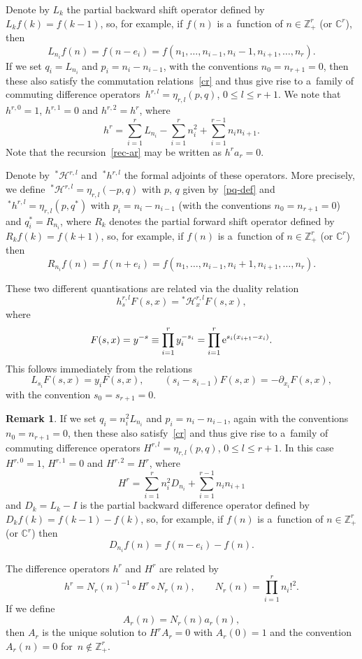 \documentclass[pdftex]{sigma}
\theoremstyle{definition}
\newtheorem{rem}[thm]{Remark}
\newcommand{\C}{{\mathbb C}}
\newcommand\Z{{\mathbb Z}}
\renewcommand\H{{\mathcal H}}
\begin{document}
Denote by $L_k$ the partial backward shift operator defined by $L_k f(k) = f(k-1)$,
so, for example, if $f(n)$ is a~function of $n\in\Z_+^r$ (or $\C^r$), then
\[L_{n_i}f(n)=f(n-e_i)=f(n_1,\dots,n_{i-1},n_i-1,n_{i+1},\dots,n_r).\]
If we set $q_i=L_{n_i}$ and $p_i=n_i-n_{i-1}$, with the conventions
$n_0=n_{r+1}=0$, then these also satisfy the commutation relations~\eqref{cr}
and thus give rise to a~family of commuting difference operators~${h^{r,l}=\eta_{r,l}(p,q)}$, $0\le l\le r+1$.
We note that $h^{r,0}=1$, $h^{r,1}=0$ and $h^{r,2}=h^r$, where
\[h^r =\sum_{i=1}^r L_{n_i} - \sum_{i=1}^r n_i^2 + \sum_{i=1}^{r-1} n_i n_{i+1}. \]
Note that the recursion~\eqref{rec-ar} may be written as $h^r a_r=0$.

Denote by $~^*\! \H^{r,l}$ and $~^*\! h^{r,l}$
the formal adjoints of these operators. More precisely, we define
$~^*\! \H^{r,l}=\eta_{r,l}(-p,q)$ with $p$, $q$ given by~\eqref{pq-def} and
$~^*\! h^{r,l} = \eta_{r,l}(p,q^*)$ with $p_i=n_i-n_{i-1}$
(with the conventions $n_0=n_{r+1}=0$) and $q_i^*=R_{n_i}$,
where $R_k$ denotes the partial forward shift operator defined by $R_k f(k) = f(k+1)$,
so, for example, if $f(n)$ is a~function of $n\in\Z_+^r$ (or $\C^r$) then
\[R_{n_i}f(n)=f(n+e_i)=f(n_1,\dots,n_{i-1},n_i+1,n_{i+1},\dots,n_r).\]

These two different quantisations are related via the duality relation
\begin{equation}\label{hH-rel}
h_s^{r,l} F(s,x) = {}^*\! \H_x^{r,l} F(s,x),
\end{equation}
where
\[F(s,x)=y^{-s}\equiv \prod_{i=1}^r y_i^{-s_i}=\prod_{i=1}^r {\rm e}^{s_i(x_{i+1}-x_{i})}.\]
This follows immediately from the relations
\[L_{s_i} F(s,x) = y_i F(s,x),\qquad (s_i-s_{i-1}) F(s,x) = - \partial_{x_i} F(s,x),\]
with the convention $s_0=s_{r+1}=0$.

\begin{rem}\label{rem-H}
If we set $q_i=n_i^2 L_{n_i}$ and $p_i=n_i-n_{i-1}$, again with the conventions
$n_0=n_{r+1}=0$, then these also satisfy~\eqref{cr}
and thus give rise to a~family of commuting difference operators
$H^{r,l}=\eta_{r,l}(p,q)$, $0\le l\le r+1$. In this case $H^{r,0}=1$, $H^{r,1}=0$ and
$H^{r,2}=H^r$, where
\[H^r = \sum_{i=1}^r n_i^2 D_{n_i} +\sum_{i=1}^{r-1} n_i n_{i+1}\]
and $D_k = L_k-I$ is the partial backward difference operator defined by $D_k f(k) = f(k-1) - f(k)$,
so, for example, if $f(n)$ is a~function of $n\in\Z_+^r$ (or $\C^r$) then
\[D_{n_i}f(n)=f(n-e_i)-f(n).\]

The difference operators $h^r$ and $H^r$ are related by
\[h^r=N_r(n)^{-1}\circ H^r \circ N_r(n),\qquad N_r(n)=\prod_{i=1}^r n_i!^2.\]
If we define
\begin{equation}\label{Ar-def}
A_r(n)=N_r(n) a_r(n),
\end{equation} then $A_r$ is the unique solution to $H^rA_r=0$
with $A_r(0)=1$ and the convention $A_r(n)=0$ for~${n\notin\Z_+^r}$.
\end{rem}
\end{document}
